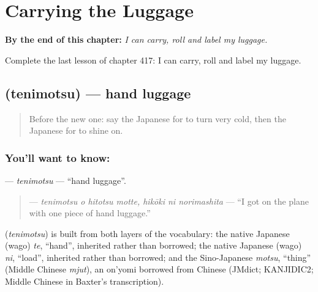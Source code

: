 
\chapter{Carrying the Luggage}
\label{ch:ja-carrying-the-luggage}

\begin{chapteropening}
\textbf{By the end of this chapter:} \emph{I can carry, roll and label my luggage.}

Complete the last lesson of chapter 417: I can carry, roll and label my luggage.
\end{chapteropening}

\section[\texorpdfstring{\ja{てにもつ} (tenimotsu)}{てにもつ (tenimotsu)}]{ (tenimotsu) — hand luggage}

\label{lesson:JA-C417-tenimotsu}



\begin{quote}
Before the new one: say the Japanese for to turn very cold, then the Japanese for to shine on.
\end{quote}

\subsection*{You'll want to know: }
\textbf{} — \emph{tenimotsu} — \textquotedblleft{}hand luggage\textquotedblright{}.

\begin{quote}
\textbf{   } — \emph{tenimotsu o hitotsu motte, hikōki ni norimashita} — \textquotedblleft{}I got on the plane with one piece of hand luggage.\textquotedblright{}
\end{quote}

\begin{cousinweb}
\textbf{} (\emph{tenimotsu}) is built from both layers of the vocabulary: the native Japanese (wago) \emph{te}, \textquotedblleft{}hand\textquotedblright{}, inherited rather than borrowed; the native Japanese (wago) \emph{ni}, \textquotedblleft{}load\textquotedblright{}, inherited rather than borrowed; and the Sino-Japanese \emph{motsu}, \textquotedblleft{}thing\textquotedblright{} (Middle Chinese \emph{mjut}), an on'yomi borrowed from Chinese (JMdict; KANJIDIC2; Middle Chinese in Baxter's transcription).
\end{cousinweb}

